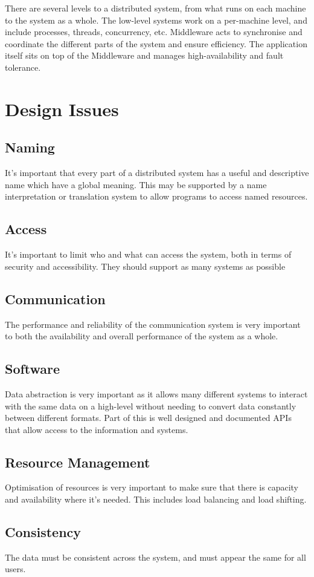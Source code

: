 There are several levels to a distributed system, from what runs on each machine to the system as a whole. The low-level systems work on a per-machine level, and include processes, threads, concurrency, etc. Middleware acts to synchronise and coordinate the different parts of the system and ensure efficiency. The application itself sits on top of the Middleware and manages high-availability and fault tolerance.

\section*{Design Issues}

\subsection*{Naming}

It's important that every part of a distributed system has a useful and descriptive name which have a global meaning. This may be supported by a name interpretation or translation system to allow programs to access named resources.

\subsection*{Access}

It's important to limit who and what can access the system, both in terms of security and accessibility. They should support as many systems as possible 

\subsection*{Communication}

The performance and reliability of the communication system is very important to both the availability and overall performance of the system as a whole.

\subsection*{Software}

Data abstraction is very important as it allows many different systems to interact with the same data on a high-level without needing to convert data constantly between different formats. Part of this is well designed and documented APIs that allow access to the information and systems.

\subsection*{Resource Management}

Optimisation of resources is very important to make sure that there is capacity and availability where it's needed. This includes load balancing and load shifting.

\subsection*{Consistency}

The data must be consistent across the system, and must appear the same for all users.